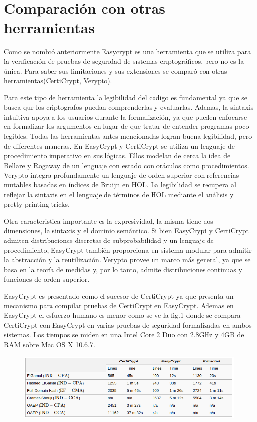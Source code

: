 \documentclass[runningheads]{llncs}
\begin{document}
\section{Comparación con otras herramientas}
Como se nombró anteriormente Easycrypt es una herramienta que se utiliza para la verificación de pruebas de seguridad de sistemas criptográficos, pero no es la única. Para saber sus limitaciones y sus extensiones se comparó con otras herramientas(CertiCrypt, Verypto).

 Para este tipo de herramienta la legibilidad del codigo es fundamental ya que se busca qur los criptografos puedan comprenderlas y evaluarlas. Ademas, la sintaxis intuitiva apoya a los usuarios durante la formalización, ya que pueden enfocarse en formalizar los argumentos en lugar de que tratar de entender programas poco legibles. Todas las herramientas antes mencionadas logran buena legibilidad, pero de diferentes maneras. En EasyCrypt y CertiCrypt se utiliza un lenguaje de procedimiento imperativo en sus lógicas. Ellos modelan de cerca la idea de Bellare y Rogaway de un lenguaje con estado con oráculos como procedimientos\cite{ref_article3}. Verypto integra profundamente un lenguaje de orden superior con referencias mutables basadas en índices de Bruijn en HOL\cite{ref_article4}. La legibilidad se recupera al reflejar la sintaxis en el lenguaje de términos de HOL mediante el análisis y pretty-printing tricks.

 Otra caracteristica importante es la expresividad, la misma tiene dos dimensiones, la sintaxis y el dominio semántico. Si bien EasyCrypt y CertiCrypt admiten distribuciones discretas de subprobabilidad y un lenguaje de procedimiento, EasyCrypt también proporciona un sistema modular para admitir la abstracción y la reutilización. Verypto provee un marco más general, ya que se basa en la teoría de medidas y, por lo tanto, admite distribuciones continuas y funciones de orden superior.
 
EasyCrypt es presentado como el sucesor de CertiCrypt ya que  presenta un mecanismo para compilar pruebas de CertiCrypt en EasyCrypt. Ademas en EasyCrypt el esfuerzo humano es menor como se ve la fig.1 donde se compara CertiCrypt con EasyCrypt en varias pruebas de seguridad formalizadas en ambos sistemas. Los tiempos se miden en una Intel Core 2 Duo con 2.8GHz y 4GB de RAM sobre Mac OS X 10.6.7.

\begin{figure}[H]
  \centering
  \includegraphics[width=.8\textwidth]{tabla_1}
  \caption{}
  \label{fig:simple}
\end{figure}
\end{document}
